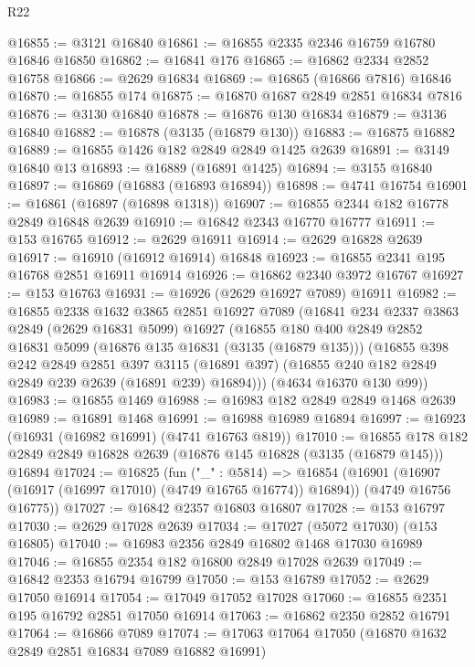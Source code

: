\begin{lexlean}{R22}
\begin{coremodule}
@16855 := @3121 @16840
@16861 := @16855 @2335 @2346 @16759 @16780 @16846 @16850
@16862 := @16841 @176
@16865 := @16862 @2334 @2852 @16758
@16866 := @2629 @16834
@16869 := @16865 (@16866 @7816) @16846
@16870 := @16855 @174
@16875 := @16870 @1687 @2849 @2851 @16834 @7816
@16876 := @3130 @16840
@16878 := @16876 @130 @16834
@16879 := @3136 @16840
@16882 := @16878 (@3135 (@16879 @130))
@16883 := @16875 @16882
@16889 := @16855 @1426 @182 @2849 @2849 @1425 @2639
@16891 := @3149 @16840 @13
@16893 := @16889 (@16891 @1425)
@16894 := @3155 @16840
@16897 := @16869 (@16883 (@16893 @16894))
@16898 := @4741 @16754
@16901 := @16861 (@16897 (@16898 @1318))
@16907 := @16855 @2344 @182 @16778 @2849 @16848 @2639
@16910 := @16842 @2343 @16770 @16777
@16911 := @153 @16765
@16912 := @2629 @16911
@16914 := @2629 @16828 @2639
@16917 := @16910 (@16912 @16914) @16848
@16923 := @16855 @2341 @195 @16768 @2851 @16911 @16914
@16926 := @16862 @2340 @3972 @16767
@16927 := @153 @16763
@16931 := @16926 (@2629 @16927 @7089) @16911
@16982 := @16855
    @2338
    @1632
    @3865
    @2851
    @16927
    @7089
    (@16841
      @234
      @2337
      @3863
      @2849
      (@2629 @16831 @5099)
      @16927
      (@16855
        @180
        @400
        @2849
        @2852
        @16831
        @5099
        (@16876 @135 @16831 (@3135 (@16879 @135)))
        (@16855
          @398
          @242
          @2849
          @2851
          @397
          @3115
          (@16891 @397)
          (@16855 @240 @182 @2849 @2849 @239 @2639 (@16891 @239) @16894)))
      (@4634 @16370 @130 @99))
@16983 := @16855 @1469
@16988 := @16983 @182 @2849 @2849 @1468 @2639
@16989 := @16891 @1468
@16991 := @16988 @16989 @16894
@16997 := @16923 (@16931 (@16982 @16991) (@4741 @16763 @819))
@17010 := @16855
    @178
    @182
    @2849
    @2849
    @16828
    @2639
    (@16876 @145 @16828 (@3135 (@16879 @145)))
    @16894
@17024 := @16825
    (fun ("_" : @5814) =>
    @16854
      (@16901 (@16907 (@16917 (@16997 @17010) (@4749 @16765 @16774)) @16894))
      (@4749 @16756 @16775))
@17027 := @16842 @2357 @16803 @16807
@17028 := @153 @16797
@17030 := @2629 @17028 @2639
@17034 := @17027 (@5072 @17030) (@153 @16805)
@17040 := @16983 @2356 @2849 @16802 @1468 @17030 @16989
@17046 := @16855 @2354 @182 @16800 @2849 @17028 @2639
@17049 := @16842 @2353 @16794 @16799
@17050 := @153 @16789
@17052 := @2629 @17050 @16914
@17054 := @17049 @17052 @17028
@17060 := @16855 @2351 @195 @16792 @2851 @17050 @16914
@17063 := @16862 @2350 @2852 @16791
@17064 := @16866 @7089
@17074 := @17063 @17064 @17050 (@16870 @1632 @2849 @2851 @16834 @7089 @16882 @16991)

\end{coremodule}
\end{lexlean}
